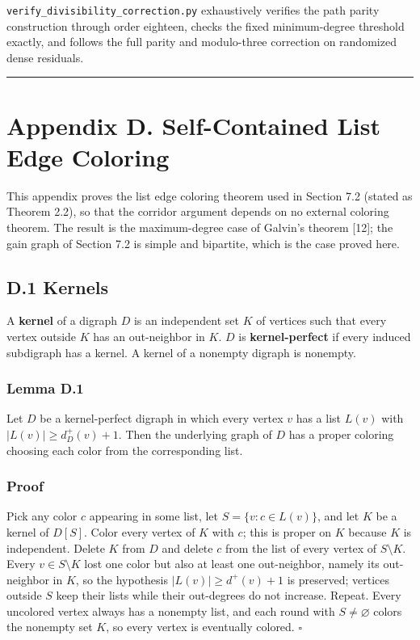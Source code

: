 \documentclass[
  11pt,
]{article}
\begin{document}
\texttt{verify\_divisibility\_correction.py} exhaustively verifies the
path parity construction through order eighteen, checks the fixed
minimum-degree threshold exactly, and follows the full parity and
modulo-three correction on randomized dense residuals.

\begin{center}\rule{0.5\linewidth}{0.5pt}\end{center}

\section{Appendix D. Self-Contained List Edge
Coloring}\label{appendix-d.-self-contained-list-edge-coloring}

This appendix proves the list edge coloring theorem used in Section 7.2
(stated as Theorem 2.2), so that the corridor argument depends on no
external coloring theorem. The result is the maximum-degree case of
Galvin's theorem {[}12{]}; the gain graph of Section 7.2 is simple and
bipartite, which is the case proved here.

\subsection{D.1 Kernels}\label{d.1-kernels}

A \textbf{kernel} of a digraph \(D\) is an independent set \(K\) of
vertices such that every vertex outside \(K\) has an out-neighbor in
\(K\). \(D\) is \textbf{kernel-perfect} if every induced subdigraph has
a kernel. A kernel of a nonempty digraph is nonempty.

\subsubsection{Lemma D.1}\label{lemma-d.1-kernel-coloring-lemma}

Let \(D\) be a kernel-perfect digraph in which every vertex \(v\) has a
list \(L(v)\) with \(|L(v)|\ge d^+_D(v)+1\). Then the underlying graph
of \(D\) has a proper coloring choosing each color from the
corresponding list.

\subsubsection{Proof}\label{proof-7}

Pick any color \(c\) appearing in some list, let \(S=\{v:c\in L(v)\}\),
and let \(K\) be a kernel of \(D[S]\). Color every vertex of \(K\) with
\(c\); this is proper on \(K\) because \(K\) is independent. Delete
\(K\) from \(D\) and delete \(c\) from the list of every vertex of
\(S\setminus K\). Every \(v\in S\setminus K\) lost one color but also at
least one out-neighbor, namely its out-neighbor in \(K\), so the
hypothesis \(|L(v)|\ge d^+(v)+1\) is preserved; vertices outside \(S\)
keep their lists while their out-degrees do not increase. Repeat. Every
uncolored vertex always has a nonempty list, and each round with
\(S\ne\varnothing\) colors the nonempty set \(K\), so every vertex is
eventually colored. \(\square\)
\end{document}
